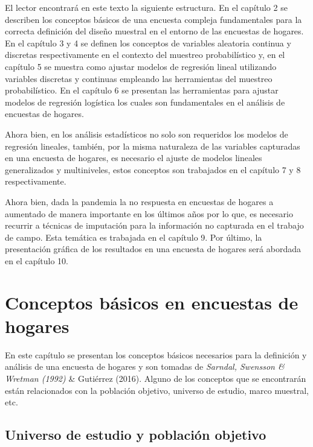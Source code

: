 \documentclass[
  12pt,
]{book}
\begin{document}
El lector encontrará en este texto la siguiente estructura. En el capítulo 2 se describen los conceptos básicos de una encuesta compleja fundamentales para la correcta definición del diseño muestral en el entorno de las encuestas de hogares. En el capítulo 3 y 4 se definen los conceptos de variables aleatoria continua y discretas respectivamente en el contexto del muestreo probabilístico y, en el capítulo 5 se muestra como ajustar modelos de regresión lineal utilizando variables discretas y continuas empleando las herramientas del muestreo probabilístico. En el capítulo 6 se presentan las herramientas para ajustar modelos de regresión logística los cuales son fundamentales en el análisis de encuestas de hogares.

Ahora bien, en los análisis estadísticos no solo son requeridos los modelos de regresión lineales, también, por la misma naturaleza de las variables capturadas en una encuesta de hogares, es necesario el ajuste de modelos lineales generalizados y multiniveles, estos conceptos son trabajados en el capítulo 7 y 8 respectivamente.

Ahora bien, dada la pandemia la no respuesta en encuestas de hogares a aumentado de manera importante en los últimos años por lo que, es necesario recurrir a técnicas de imputación para la información no capturada en el trabajo de campo. Esta temática es trabajada en el capítulo 9. Por último, la presentación gráfica de los resultados en una encuesta de hogares será abordada en el capítulo 10.

\hypertarget{conceptos-buxe1sicos-en-encuestas-de-hogares}{%
\chapter{Conceptos básicos en encuestas de hogares}\label{conceptos-buxe1sicos-en-encuestas-de-hogares}}

En este capítulo se presentan los conceptos básicos necesarios para la definición y análisis de una encuesta de hogares y son tomadas de \emph{Sarndal, Swensson \& Wretman (1992)} \& Gutiérrez (2016). Alguno de los conceptos que se encontrarán están relacionados con la población objetivo, universo de estudio, marco muestral, etc.

\hypertarget{universo-de-estudio-y-poblaciuxf3n-objetivo}{%
\section{Universo de estudio y población objetivo}\label{universo-de-estudio-y-poblaciuxf3n-objetivo}}
\end{document}
